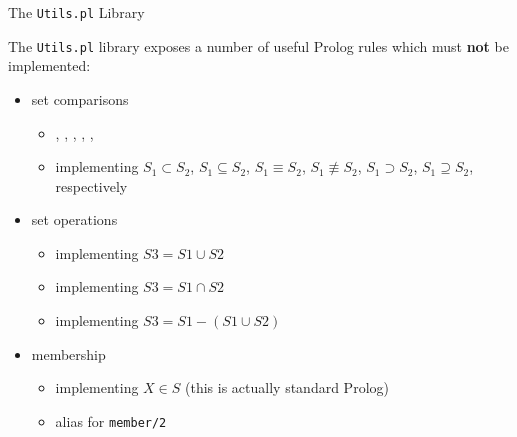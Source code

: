 \documentclass[presentation]{beamer}\mode<presentation>{\usetheme{AMSBolognaFC}}
\begin{document}
\begin{frame}[c]{The \texttt{Utils.pl} Library}

    The \texttt{Utils.pl} library exposes a number of useful Prolog rules which must \textbf{not} be implemented:
    \vfill
    \begin{itemize}
        \item set comparisons %
        \begin{itemize}
            \item {}, , , , , 
            \item implementing $S_1 \subset S_2$, $S_1 \subseteq S_2$, $S_1 \equiv S_2$, $S_1 \not\equiv S_2$, $S_1 \supset S_2$, $S_1 \supseteq S_2$, respectively
        \end{itemize}

        \vfill

        \item set operations
        \begin{itemize}
            \item {} implementing $S3 = S1 \cup S2$
            \item {} implementing $S3 = S1 \cap S2$
            \item {} implementing $S3 = S1 - (S1 \cup S2)$
        \end{itemize}

        \vfill

        \item membership
        \begin{itemize}
            \item {} implementing $X \in S$ \hfill {\small (this is actually standard Prolog)}
            \item {} alias for \texttt{member/2}
        \end{itemize}
    \end{itemize}
\end{frame}
\end{document}
